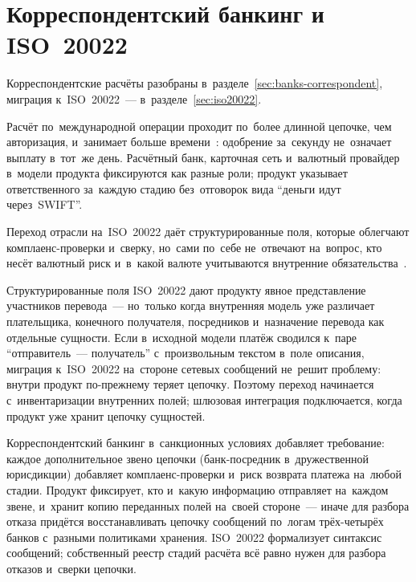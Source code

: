 \section{Корреспондентский банкинг и ISO~20022}\label{sec:mc-correspondent}

Корреспондентские расчёты разобраны в~разделе~\ref{sec:banks-correspondent},
миграция к~ISO~20022~--- в~разделе~\ref{sec:iso20022}.

Расчёт по~международной операции проходит по~более длинной цепочке, чем
авторизация, и~занимает больше
времени~\cite{fatf-correspondent-banking,swift-instant-interoperability}:
одобрение за~секунду не~означает выплату в~тот~же день. Расчётный банк,
карточная сеть и~валютный провайдер в~модели продукта фиксируются как разные
роли; продукт указывает ответственного за~каждую стадию без~отговорок вида
\enquote{деньги идут через~SWIFT}.

Переход отрасли на~ISO~20022 даёт структурированные поля, которые облегчают
комплаенс-проверки и~сверку, но~сами по~себе не~отвечают на~вопрос,
кто несёт валютный риск и~в~какой валюте учитываются внутренние
обязательства~\cite{iso-20022,swift-iso20022-milestone,swift-transaction-manager-iso20022}.

Структурированные поля ISO~20022 дают продукту явное представление участников
перевода~--- но~только когда внутренняя модель уже различает плательщика,
конечного получателя, посредников и~назначение перевода как отдельные сущности.
Если в~исходной модели платёж сводился к~паре \enquote{отправитель~---
получатель} с~произвольным текстом в~поле описания, миграция к~ISO~20022
на~стороне сетевых сообщений не~решит проблему: внутри продукт по-прежнему
теряет цепочку. Поэтому переход начинается с~инвентаризации внутренних полей;
шлюзовая интеграция подключается, когда продукт уже хранит цепочку сущностей.

Корреспондентский банкинг в~санкционных условиях добавляет требование: каждое дополнительное звено цепочки (банк-посредник в~дружественной
юрисдикции) добавляет комплаенс-проверки и~риск возврата платежа на~любой
стадии. Продукт фиксирует, кто и~какую информацию отправляет на~каждом звене,
и~хранит копию переданных полей на~своей стороне~--- иначе для разбора отказа
придётся восстанавливать цепочку сообщений по~логам трёх-четырёх банков
с~разными политиками хранения. ISO~20022 формализует синтаксис сообщений;
собственный реестр стадий расчёта всё равно нужен для разбора отказов и~сверки
цепочки.
